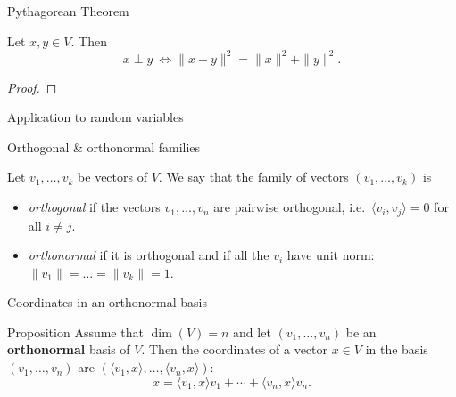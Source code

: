 \documentclass{beamer}
\begin{document}
\begin{frame}{Pythagorean Theorem}
	\grid

	\vspace{-0.4cm}
	\begin{theorem}
		Let $x,y \in V$. Then
		$$
		x \perp y \ \Longleftrightarrow \|x+y\|^2 = \|x\|^2 + \|y\|^2.
		$$
	\end{theorem}
	\begin{proof}
		\vfill
		\vspace{4cm}
	\end{proof}
\end{frame}

\begin{frame}[t]{Application to random variables}
	\grid

\end{frame}

\begin{frame}[t]{Orthogonal \& orthonormal families}
	\grid

	\vspace{-0.4cm}
	\begin{definition}
		Let $v_1, \dots, v_k$ be vectors of $V$. We say that the family of vectors $(v_1, \dots, v_k)$ is
		\begin{itemize}
			\item \emph{orthogonal} if the vectors $v_1, \dots, v_n$ are pairwise orthogonal, i.e.\ $\langle v_i, v_j \rangle = 0$ for all $i \neq j$.
			\item \emph{orthonormal} if it is orthogonal and if all the $v_i$ have unit norm: $\|v_1\| = \dots = \|v_k\| = 1$.
		\end{itemize}
	\end{definition}
\end{frame}

\begin{frame}[t]{Coordinates in an orthonormal basis}
	\grid

	\vspace{-0.4cm}
	\begin{block}{Proposition}
		Assume that $\dim(V)=n$ and let $(v_1, \dots, v_n)$ be an \textbf{orthonormal} basis of $V$. Then the coordinates of a vector $x \in V$ in the basis $(v_1, \dots, v_n)$ are $(\langle v_1, x\rangle, \dots, \langle v_n,x \rangle)$:
		$$
		x = \langle v_1, x \rangle v_1 + \cdots + \langle v_n, x \rangle v_n.
		$$
	\end{block}

\end{frame}
\end{document}
